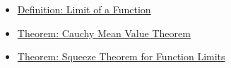\begin{dependencies}
\begin{itemize}
  \item \hyperref[def:limit-function]{Definition: Limit of a Function}
  \item \hyperref[thm:cauchy-mean-value-theorem]{Theorem: Cauchy Mean Value Theorem}
  \item \hyperref[thm:squeeze-function-limits]{Theorem: Squeeze Theorem for Function Limits}
\end{itemize}
\end{dependencies}
